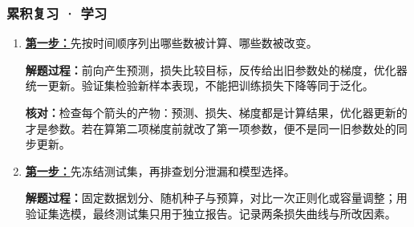 \subsubsection*{累积复习 · 学习}
\begin{enumerate}[label={},leftmargin=4.8em,itemsep=4pt]
\item[\textbf{R-01.}] \leavevmode{}\label{solution:R-01}\label{solution:review-learning-cycle}\hyperref[exercise:review-learning-cycle]{\textbf{第一步：}}先按时间顺序列出哪些数被计算、哪些数被改变。\par\nobreak\textbf{解题过程：}前向产生预测，损失比较目标，反传给出旧参数处的梯度，优化器统一更新。验证集检验新样本表现，不能把训练损失下降等同于泛化。\par\textbf{核对：}检查每个箭头的产物：预测、损失、梯度都是计算结果，优化器更新的才是参数。若在算第二项梯度前就改了第一项参数，便不是同一旧参数处的同步更新。
\item[\textbf{R-02.}] \leavevmode{}\label{solution:R-02}\label{solution:review-validation-experiment}\hyperref[exercise:review-validation-experiment]{\textbf{第一步：}}先冻结测试集，再排查划分泄漏和模型选择。\par\nobreak\textbf{解题过程：}固定数据划分、随机种子与预算，对比一次正则化或容量调整；用验证集选模，最终测试集只用于独立报告。记录两条损失曲线与所改因素。
\end{enumerate}
